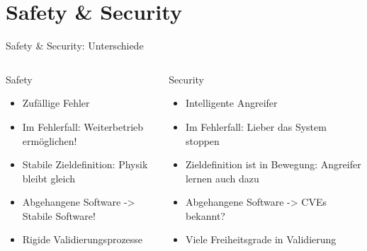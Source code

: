 \section{Safety \& Security}


\begin{frame}[T]{Safety \& Security: Unterschiede}
\small
  \begin{columns}[t,fullwidth]
   \hfill
    \begin{column}{.45\linewidth}
      \begin{block}{Safety}
      \begin{itemize}
        \item Zufällige Fehler
        \item Im Fehlerfall: Weiterbetrieb ermöglichen!
        \item Stabile Zieldefinition: Physik bleibt gleich
        \item Abgehangene Software -> Stabile Software!
        \item Rigide Validierungsprozesse
      \end{itemize}
      \end{block}
    \end{column}
    \hfill
    \begin{column}{.45\linewidth}
      \begin{block}{Security}
      \begin{itemize}
        \item Intelligente Angreifer
        \item Im Fehlerfall: Lieber das System stoppen
        \item Zieldefinition ist in Bewegung: Angreifer lernen auch dazu
        \item Abgehangene Software -> CVEs bekannt?
        \item Viele Freiheitsgrade in Validierung
      \end{itemize}
      \end{block}
    \end{column}
    \hfill
  \end{columns}
\end{frame}


